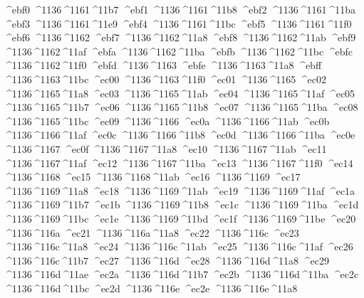 \checkit ^^^^ebf0 ^^^^1136^^^^1161^^^^11b7
\checkit ^^^^ebf1 ^^^^1136^^^^1161^^^^11b8
\checkit ^^^^ebf2 ^^^^1136^^^^1161^^^^11ba
\checkit ^^^^ebf3 ^^^^1136^^^^1161^^^^11e9
\checkit ^^^^ebf4 ^^^^1136^^^^1161^^^^11bc
\checkit ^^^^ebf5 ^^^^1136^^^^1161^^^^11f0
\checkit ^^^^ebf6 ^^^^1136^^^^1162
\checkit ^^^^ebf7 ^^^^1136^^^^1162^^^^11a8
\checkit ^^^^ebf8 ^^^^1136^^^^1162^^^^11ab
\checkit ^^^^ebf9 ^^^^1136^^^^1162^^^^11af
\checkit ^^^^ebfa ^^^^1136^^^^1162^^^^11ba
\checkit ^^^^ebfb ^^^^1136^^^^1162^^^^11bc
\checkit ^^^^ebfc ^^^^1136^^^^1162^^^^11f0
\checkit ^^^^ebfd ^^^^1136^^^^1163
\checkit ^^^^ebfe ^^^^1136^^^^1163^^^^11a8
\checkit ^^^^ebff ^^^^1136^^^^1163^^^^11bc
\checkit ^^^^ec00 ^^^^1136^^^^1163^^^^11f0
\checkit ^^^^ec01 ^^^^1136^^^^1165
\checkit ^^^^ec02 ^^^^1136^^^^1165^^^^11a8
\checkit ^^^^ec03 ^^^^1136^^^^1165^^^^11ab
\checkit ^^^^ec04 ^^^^1136^^^^1165^^^^11af
\checkit ^^^^ec05 ^^^^1136^^^^1165^^^^11b7
\checkit ^^^^ec06 ^^^^1136^^^^1165^^^^11b8
\checkit ^^^^ec07 ^^^^1136^^^^1165^^^^11ba
\checkit ^^^^ec08 ^^^^1136^^^^1165^^^^11bc
\checkit ^^^^ec09 ^^^^1136^^^^1166
\checkit ^^^^ec0a ^^^^1136^^^^1166^^^^11ab
\checkit ^^^^ec0b ^^^^1136^^^^1166^^^^11af
\checkit ^^^^ec0c ^^^^1136^^^^1166^^^^11b8
\checkit ^^^^ec0d ^^^^1136^^^^1166^^^^11ba
\checkit ^^^^ec0e ^^^^1136^^^^1167
\checkit ^^^^ec0f ^^^^1136^^^^1167^^^^11a8
\checkit ^^^^ec10 ^^^^1136^^^^1167^^^^11ab
\checkit ^^^^ec11 ^^^^1136^^^^1167^^^^11af
\checkit ^^^^ec12 ^^^^1136^^^^1167^^^^11ba
\checkit ^^^^ec13 ^^^^1136^^^^1167^^^^11f0
\checkit ^^^^ec14 ^^^^1136^^^^1168
\checkit ^^^^ec15 ^^^^1136^^^^1168^^^^11ab
\checkit ^^^^ec16 ^^^^1136^^^^1169
\checkit ^^^^ec17 ^^^^1136^^^^1169^^^^11a8
\checkit ^^^^ec18 ^^^^1136^^^^1169^^^^11ab
\checkit ^^^^ec19 ^^^^1136^^^^1169^^^^11af
\checkit ^^^^ec1a ^^^^1136^^^^1169^^^^11b7
\checkit ^^^^ec1b ^^^^1136^^^^1169^^^^11b8
\checkit ^^^^ec1c ^^^^1136^^^^1169^^^^11ba
\checkit ^^^^ec1d ^^^^1136^^^^1169^^^^11bc
\checkit ^^^^ec1e ^^^^1136^^^^1169^^^^11bd
\checkit ^^^^ec1f ^^^^1136^^^^1169^^^^11be
\checkit ^^^^ec20 ^^^^1136^^^^116a
\checkit ^^^^ec21 ^^^^1136^^^^116a^^^^11a8
\checkit ^^^^ec22 ^^^^1136^^^^116c
\checkit ^^^^ec23 ^^^^1136^^^^116c^^^^11a8
\checkit ^^^^ec24 ^^^^1136^^^^116c^^^^11ab
\checkit ^^^^ec25 ^^^^1136^^^^116c^^^^11af
\checkit ^^^^ec26 ^^^^1136^^^^116c^^^^11b7
\checkit ^^^^ec27 ^^^^1136^^^^116d
\checkit ^^^^ec28 ^^^^1136^^^^116d^^^^11a8
\checkit ^^^^ec29 ^^^^1136^^^^116d^^^^11ae
\checkit ^^^^ec2a ^^^^1136^^^^116d^^^^11b7
\checkit ^^^^ec2b ^^^^1136^^^^116d^^^^11ba
\checkit ^^^^ec2c ^^^^1136^^^^116d^^^^11bc
\checkit ^^^^ec2d ^^^^1136^^^^116e
\checkit ^^^^ec2e ^^^^1136^^^^116e^^^^11a8

